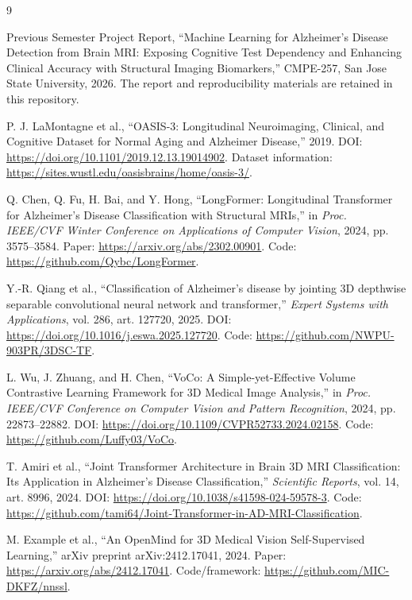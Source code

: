 \documentclass[11pt]{article}
\begin{document}
\begin{thebibliography}{9}

Previous Semester Project Report, ``Machine Learning for Alzheimer's Disease Detection from Brain MRI: Exposing Cognitive Test Dependency and Enhancing Clinical Accuracy with Structural Imaging Biomarkers,'' CMPE-257, San Jose State University, 2026. The report and reproducibility materials are retained in this repository.

P. J. LaMontagne et al., ``OASIS-3: Longitudinal Neuroimaging, Clinical, and Cognitive Dataset for Normal Aging and Alzheimer Disease,'' 2019. DOI: \url{https://doi.org/10.1101/2019.12.13.19014902}. Dataset information: \url{https://sites.wustl.edu/oasisbrains/home/oasis-3/}.

Q. Chen, Q. Fu, H. Bai, and Y. Hong, ``LongFormer: Longitudinal Transformer for Alzheimer's Disease Classification with Structural MRIs,'' in \textit{Proc. IEEE/CVF Winter Conference on Applications of Computer Vision}, 2024, pp. 3575--3584. Paper: \url{https://arxiv.org/abs/2302.00901}. Code: \url{https://github.com/Qybc/LongFormer}.

Y.-R. Qiang et al., ``Classification of Alzheimer's disease by jointing 3D depthwise separable convolutional neural network and transformer,'' \textit{Expert Systems with Applications}, vol. 286, art. 127720, 2025. DOI: \url{https://doi.org/10.1016/j.eswa.2025.127720}. Code: \url{https://github.com/NWPU-903PR/3DSC-TF}.

L. Wu, J. Zhuang, and H. Chen, ``VoCo: A Simple-yet-Effective Volume Contrastive Learning Framework for 3D Medical Image Analysis,'' in \textit{Proc. IEEE/CVF Conference on Computer Vision and Pattern Recognition}, 2024, pp. 22873--22882. DOI: \url{https://doi.org/10.1109/CVPR52733.2024.02158}. Code: \url{https://github.com/Luffy03/VoCo}.

T. Amiri et al., ``Joint Transformer Architecture in Brain 3D MRI Classification: Its Application in Alzheimer's Disease Classification,'' \textit{Scientific Reports}, vol. 14, art. 8996, 2024. DOI: \url{https://doi.org/10.1038/s41598-024-59578-3}. Code: \url{https://github.com/tami64/Joint-Transformer-in-AD-MRI-Classification}.

M. Example et al., ``An OpenMind for 3D Medical Vision Self-Supervised Learning,'' arXiv preprint arXiv:2412.17041, 2024. Paper: \url{https://arxiv.org/abs/2412.17041}. Code/framework: \url{https://github.com/MIC-DKFZ/nnssl}.


\end{thebibliography}
\end{document}

